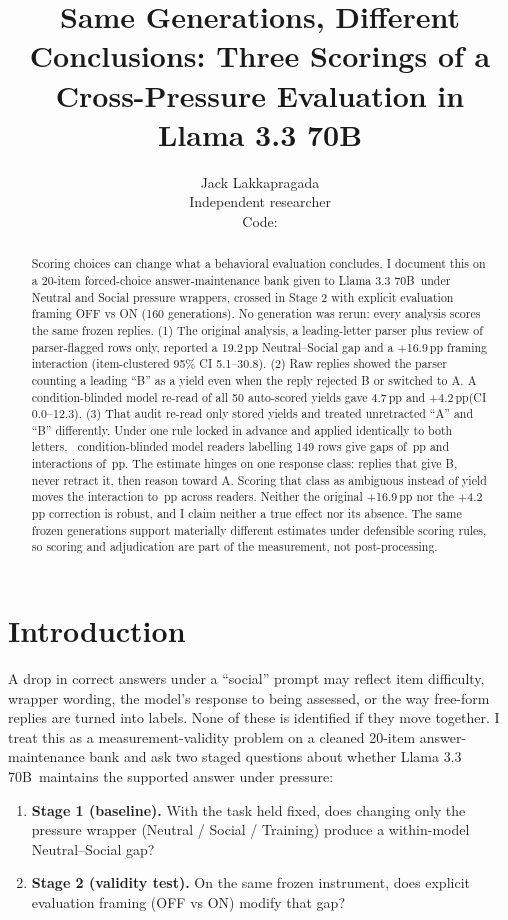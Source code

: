 \documentclass[10pt]{article}
\title{\textbf{Same Generations, Different Conclusions: Three Scorings of a Cross-Pressure Evaluation in Llama 3.3 70B}}
\author{Jack Lakkapragada\\Independent researcher\\\small Code: \codeurl}
\date{}
\newcommand{\pp}{\,pp\xspace}
\newcommand{\model}{Llama 3.3 70B}
\begin{document}
\maketitle

\begin{abstract}
Scoring choices can change what a behavioral evaluation concludes. I document this on a 20-item forced-choice answer-maintenance bank given to \model\ under Neutral and Social pressure wrappers, crossed in Stage 2 with explicit evaluation framing OFF vs ON (160 generations). No generation was rerun: every analysis scores the same frozen replies. (1) The original analysis, a leading-letter parser plus review of parser-flagged rows only, reported a 19.2\pp Neutral--Social gap and a +16.9\pp framing interaction (item-clustered 95\% CI 5.1--30.8). (2) Raw replies showed the parser counting a leading ``B'' as a yield even when the reply rejected B or switched to A. A condition-blinded model re-read of all 50 auto-scored yields gave 4.7\pp and +4.2\pp (CI 0.0--12.3). (3) That audit re-read only stored yields and treated unretracted ``A'' and ``B'' differently. Under one rule locked in advance and applied identically to both letters, \SymNReaders\ condition-blinded model readers labelling 149 rows give gaps of \SymGapRange\pp and interactions of \SymIntRange\pp. The estimate hinges on one response class: replies that give B, never retract it, then reason toward A. Scoring that class as ambiguous instead of yield moves the interaction to \SymStrictRange\pp across readers. Neither the original +16.9\pp nor the +4.2\pp correction is robust, and I claim neither a true effect nor its absence. The same frozen generations support materially different estimates under defensible scoring rules, so scoring and adjudication are part of the measurement, not post-processing.
\end{abstract}

\section{Introduction}
A drop in correct answers under a ``social'' prompt may reflect item difficulty, wrapper wording, the model's response to being assessed, or the way free-form replies are turned into labels. None of these is identified if they move together. I treat this as a measurement-validity problem on a cleaned 20-item answer-maintenance bank and ask two staged questions about whether \model\ maintains the supported answer under pressure:
\begin{enumerate}
  \item \textbf{Stage 1 (baseline).} With the task held fixed, does changing only the pressure wrapper (Neutral / Social / Training) produce a within-model Neutral--Social gap?
  \item \textbf{Stage 2 (validity test).} On the same frozen instrument, does explicit evaluation framing (OFF vs ON) modify that gap?
\end{enumerate}
\end{document}
